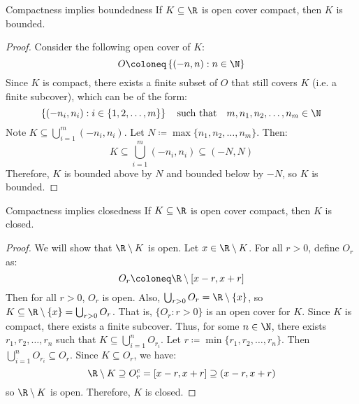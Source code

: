 \begin{thmbox}{Compactness implies boundedness}{}
    If $K \subseteq \R$ is open cover compact, then $K$ is bounded.
    \tcblower
    \begin{proof}
        Consider the following open cover of $K$:
        \[ O \coloneq \left\{ (-n ,n) : n \in \N \right\} \]
        Since $K$ is compact, there exists a finite subset of $O$ that still covers $K$ (i.e. a finite subcover), which can be of the form:
        \[ \left\{ (-n_i, n_i) : i \in \{ 1,2,\ldots,m \} \right\} \quad \text{such that} \quad m, n_1, n_2, \ldots, n_m \in \N \]
        Note $K \subseteq \bigcup_{i=1}^{m} (-n_i, n_i)$. Let $N \coloneq \max\{n_1, n_2, \ldots, n_m\}$. Then:
        \[ K \subseteq \bigcup_{i = 1}^m \left( -n_i, n_i \right) \subseteq (-N, N) \]
        Therefore, $K$ is bounded above by $N$ and bounded below by $-N$, so $K$ is bounded.
    \end{proof}
\end{thmbox}

\begin{thmbox}{Compactness implies closedness}{}
    If $K \subseteq \R$ is open cover compact, then $K$ is closed.
    \tcblower
    \begin{proof}
        We will show that $\R \setminus K$ is open. Let $x \in \R \setminus K$. For all $r > 0$, define $O_r$ as:
        \[O_r \coloneq \R \setminus [x-r, x+r]\]
        Then for all $r > 0$, $O_r$ is open. Also, $\bigcup_{r>0} O_r = \R \setminus \{x\}$, so $K \subseteq \R \setminus \{x\} = \bigcup_{r>0}O_r$. That is, $\{O_r : r > 0\}$ is an open cover for $K$. Since $K$ is compact, there exists a finite subcover. Thus, for some $n \in \N$, there exists $r_1, r_2, \ldots, r_n$ such that $K \subseteq \bigcup_{i=1}^{n} O_{r_i}$. Let $r \coloneq \min\{r_1, r_2, \ldots, r_n\}$. Then $\bigcup_{i=1}^{n} O_{r_i} \subseteq O_r$. Since $K \subseteq O_r$, we have:
        \[ \R \setminus K \supseteq O_r^c = [x-r, x+r] \supseteq (x-r, x+r) \]
        so $\R \setminus K$ is open. Therefore, $K$ is closed.
    \end{proof}
\end{thmbox}

